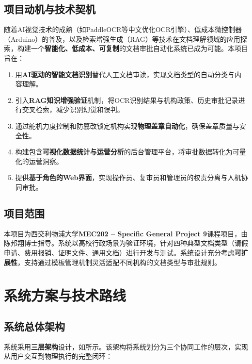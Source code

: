 \documentclass[conference]{IEEEtran}
\begin{document}
\subsection{项目动机与技术契机}

随着AI视觉技术的成熟（如PaddleOCR等中文优化OCR引擎）、低成本微控制器（Arduino）的普及，以及检索增强生成（RAG）等技术在文档理解领域的应用探索，构建一个\textbf{智能化、低成本、可复制}的文档审批自动化系统已成为可能。本项目旨在：

\begin{enumerate}[leftmargin=*]
    \item 用\textbf{AI驱动的智能文档识别}替代人工文档审读，实现文档类型的自动分类与内容理解。
    \item 引入\textbf{RAG知识增强验证}机制，将OCR识别结果与机构政策、历史审批记录进行交叉检索，减少识别幻觉和误判。
    \item 通过舵机力度控制和防篡改锁定机构实现\textbf{物理盖章自动化}，确保盖章质量与安全性。
    \item 构建包含\textbf{可视化数据统计与运营分析}的后台管理平台，将审批数据转化为可量化的运营洞察。
    \item 提供\textbf{基于角色的Web界面}，实现操作员、复审员和管理员的权责分离与人机协同审批。
\end{enumerate}

\subsection{项目范围}

本项目为西交利物浦大学\textbf{MEC202 -- Specific General Project 9}课程项目，由陈邦翔博士指导。系统以高校行政场景为验证环境，针对四种典型文档类型（请假申请、费用报销、证明文件、通用文档）进行开发与测试。系统设计充分考虑\textbf{可扩展性}，支持通过模板管理机制灵活适配不同机构的文档类型与审批规则。

\section{系统方案与技术路线}

\subsection{系统总体架构}

系统采用\textbf{三层架构}设计，如所示。该架构将系统划分为三个协同工作的层次，实现从用户交互到物理执行的完整闭环：
\end{document}
